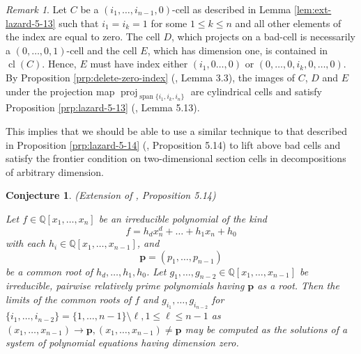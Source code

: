 \documentclass[
]{book}
\newtheorem{conjecture}{Conjecture}[chapter]
\theoremstyle{definition}
\theoremstyle{definition}
\theoremstyle{definition}
\theoremstyle{definition}
\theoremstyle{remark}
\newtheorem*{remark}{Remark}
\begin{document}
\begin{remark}
Let \(C\) be a \((i_1,\ldots,i_{n-1},0)\)-cell as described in Lemma \ref{lem:ext-lazard-5-13} such that \(i_1=i_k = 1\) for some \(1 \le k \le n\) and all other elements of the index are equal to zero.
The cell \(D\), which projects on a bad-cell is necessarily a \((0,\ldots,0,1)\)-cell and the cell \(E\), which has dimension one, is contained in \({\operatorname{cl} \left( C \right)}\). Hence, \(E\) must have index either \((i_1,0\ldots,0)\) or \((0,\ldots,0,i_k,0,\ldots,0)\).
By Proposition \ref{prp:delete-zero-index} (\citet{bgv15}, Lemma 3.3), the images of \(C\), \(D\) and \(E\) under the projection map \({\operatorname{proj}_{{\operatorname{span} \{i_1,i_k,i_n\}}}}\) are cylindrical cells and satisfy Proposition \ref{prp:lazard-5-13} (\citet{lazard10}, Lemma 5.13).
\end{remark}

This implies that we should be able to use a similar technique to that described in Proposition \ref{prp:lazard-5-14} (\citet{lazard10}, Proposition 5.14) to lift above bad cells and satisfy the frontier condition on two-dimensional section cells in decompositions of arbitrary dimension.

\begin{conjecture}
\protect\hypertarget{cnj:ext-lazard-5-14}{}\label{cnj:ext-lazard-5-14}(Extension of \citet{lazard10}, Proposition 5.14)

Let \(f \in \mathbb{Q}[x_1,\ldots,x_n]\) be an irreducible polynomial of the kind
\[f = h_dx_n^d + \ldots + h_1x_n + h_0\]
with each \(h_i \in \mathbb{Q}[x_1,\ldots,x_{n-1}]\), and
\[\mathbf{p} = (p_1,\ldots,p_{n-1})\]
be a common root of \(h_d,\ldots,h_1,h_0\).
Let \(g_1,\ldots,g_{n-2}\in \mathbb{Q}[x_1,\ldots,x_{n-1}]\) be irreducible, pairwise relatively prime polynomials having \(\mathbf{p}\) as a root.
Then the limits of the common roots of \(f\) and \(g_{i_1},\ldots,g_{i_{n-2}}\) for \(\{i_1,\ldots,i_{n-2}\} = \{1,\ldots,n-1\} \setminus \ell, 1 \le \ell \le n-1\) as \((x_1, \ldots,x_{n-1}) \to \mathbf{p}, (x_1, \ldots, x_{n-1}) \ne \mathbf{p}\) may be computed as the solutions of a system of polynomial equations having dimension zero.
\end{conjecture}
\end{document}
